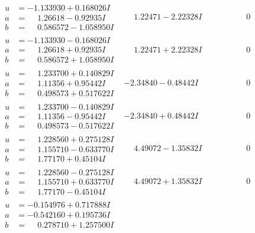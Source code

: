 \documentclass[1p]{elsarticle_modified}
\theoremstyle{definition}
\begin{document}
$$\begin{array}{c|c|c}
\begin{aligned}
u &= -1.133930 + 0.168026 I \\
a &= \phantom{-}1.26618 - 0.92935 I \\
b &= \phantom{-}0.586572 - 1.058950 I\end{aligned}
 & \phantom{-}1.22471 - 2.22328 I & \phantom{-0.000000 } 0 \\ \hline\begin{aligned}
u &= -1.133930 - 0.168026 I \\
a &= \phantom{-}1.26618 + 0.92935 I \\
b &= \phantom{-}0.586572 + 1.058950 I\end{aligned}
 & \phantom{-}1.22471 + 2.22328 I & \phantom{-0.000000 } 0 \\ \hline\begin{aligned}
u &= \phantom{-}1.233700 + 0.140829 I \\
a &= \phantom{-}1.11356 + 0.95442 I \\
b &= \phantom{-}0.498573 + 0.517622 I\end{aligned}
 & -2.34840 - 0.48442 I & \phantom{-0.000000 } 0 \\ \hline\begin{aligned}
u &= \phantom{-}1.233700 - 0.140829 I \\
a &= \phantom{-}1.11356 - 0.95442 I \\
b &= \phantom{-}0.498573 - 0.517622 I\end{aligned}
 & -2.34840 + 0.48442 I & \phantom{-0.000000 } 0 \\ \hline\begin{aligned}
u &= \phantom{-}1.228560 + 0.275128 I \\
a &= \phantom{-}1.155710 - 0.633770 I \\
b &= \phantom{-}1.77170 + 0.45104 I\end{aligned}
 & \phantom{-}4.49072 - 1.35832 I & \phantom{-0.000000 } 0 \\ \hline\begin{aligned}
u &= \phantom{-}1.228560 - 0.275128 I \\
a &= \phantom{-}1.155710 + 0.633770 I \\
b &= \phantom{-}1.77170 - 0.45104 I\end{aligned}
 & \phantom{-}4.49072 + 1.35832 I & \phantom{-0.000000 } 0 \\ \hline\begin{aligned}
u &= -0.154976 + 0.717888 I \\
a &= -0.542160 + 0.195736 I \\
b &= \phantom{-}0.278710 + 1.257500 I\end{aligned}

\end{array}$$
\end{document}
